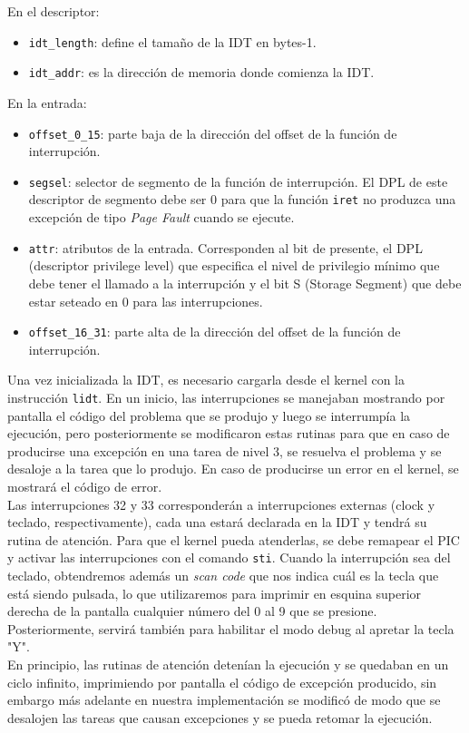 \documentclass[a4paper]{article}
\begin{document}
En el descriptor:
\begin{itemize}
\item {\tt idt_length}: define el tamaño de la IDT en bytes-1.
\item {\tt idt_addr}: es la dirección de memoria donde comienza la IDT.
\end{itemize}

En la entrada:
\begin{itemize}
\item {\tt offset_0_15}: parte baja de la dirección del offset de la función de interrupción.
\item {\tt segsel}: selector de segmento de la función de interrupción. El DPL de este descriptor de segmento debe ser 0 para que la función {\tt iret} no produzca una excepción de tipo \textit{Page Fault} cuando se ejecute.
\item {\tt attr}: atributos de la entrada. Corresponden al bit de presente, el DPL (descriptor privilege level) que especifica el nivel de privilegio mínimo que debe tener el llamado a la interrupción y el bit S (Storage Segment) que debe estar seteado en 0 para las interrupciones.
\item {\tt offset_16_31}: parte alta de la dirección del offset de la función de interrupción.
\end{itemize}

Una vez inicializada la IDT, es necesario cargarla desde el kernel con la instrucción {\tt lidt}. En un inicio, las interrupciones se manejaban mostrando por pantalla el código del problema que se produjo y luego se interrumpía la ejecución, pero posteriormente se modificaron estas rutinas para que en caso de producirse una excepción en una tarea de nivel 3, se resuelva el problema y se desaloje a la tarea que lo produjo. En caso de producirse un error en el kernel, se mostrará el código de error. \\
Las interrupciones 32 y 33 corresponderán a interrupciones externas (clock y teclado, respectivamente), cada una estará declarada en la IDT y tendrá su rutina de atención. Para que el kernel pueda atenderlas, se debe remapear el PIC y activar las interrupciones con el comando {\tt sti}. Cuando la interrupción sea del teclado, obtendremos además un \textit{scan code} que nos indica cuál es la tecla que está siendo pulsada, lo que utilizaremos para imprimir en esquina superior derecha de la pantalla cualquier número del 0 al 9 que se presione. Posteriormente, servirá también para habilitar el modo debug al apretar la tecla "Y". \\
En principio, las rutinas de atención detenían la ejecución y se quedaban en un ciclo infinito, imprimiendo por pantalla el código de excepción producido, sin embargo más adelante en nuestra implementación se modificó de modo que se desalojen las tareas que causan excepciones y se pueda retomar la ejecución.
\end{document}
